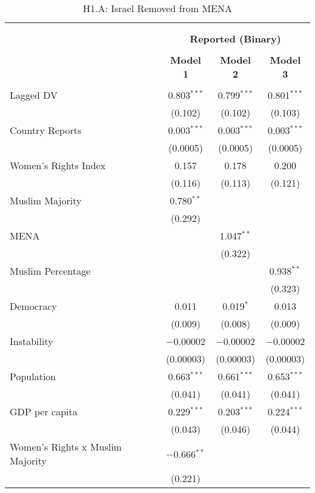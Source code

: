 
\begin{table}[!htbp] \centering 
  \caption{H1.A: Israel Removed from MENA} 
  \label{} 
\begin{tabular}{@{\extracolsep{5pt}}lccc} 
\\[-1.8ex]\hline \\[-1.8ex] 
\\[-1.8ex] & \multicolumn{3}{c}{\textbf{Reported (Binary)}} \\ 
\\[-1.8ex] & \textbf{Model 1} & \textbf{Model 2} & \textbf{Model 3}\\ 
\hline \\[-1.8ex] 
 Lagged DV & 0.803$^{***}$ & 0.799$^{***}$ & 0.801$^{***}$ \\ 
  & (0.102) & (0.102) & (0.103) \\ 
  Country Reports & 0.003$^{***}$ & 0.003$^{***}$ & 0.003$^{***}$ \\ 
  & (0.0005) & (0.0005) & (0.0005) \\ 
  Women's Rights Index & 0.157 & 0.178 & 0.200 \\ 
  & (0.116) & (0.113) & (0.121) \\ 
  Muslim Majority & 0.780$^{**}$ &  &  \\ 
  & (0.292) &  &  \\ 
  MENA &  & 1.047$^{**}$ &  \\ 
  &  & (0.322) &  \\ 
  Muslim Percentage &  &  & 0.938$^{**}$ \\ 
  &  &  & (0.323) \\ 
  Democracy & 0.011 & 0.019$^{*}$ & 0.013 \\ 
  & (0.009) & (0.008) & (0.009) \\ 
  Instability & $-$0.00002 & $-$0.00002 & $-$0.00002 \\ 
  & (0.00003) & (0.00003) & (0.00003) \\ 
  Population & 0.663$^{***}$ & 0.661$^{***}$ & 0.653$^{***}$ \\ 
  & (0.041) & (0.041) & (0.041) \\ 
  GDP per capita & 0.229$^{***}$ & 0.203$^{***}$ & 0.224$^{***}$ \\ 
  & (0.043) & (0.046) & (0.044) \\ 
  Women's Rights x Muslim Majority & $-$0.666$^{**}$ &  &  \\ 
  & (0.221) &  &  \\ 

\end{tabular}
\end{table}
